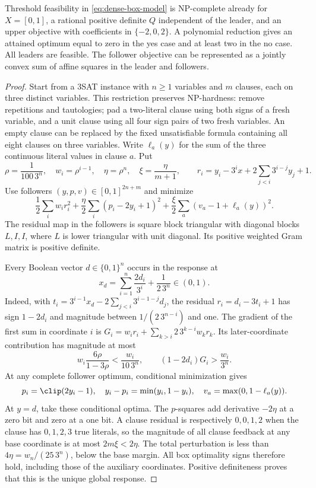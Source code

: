 \begin{theorem}\label{thm:dense-hardness}
Threshold feasibility in \eqref{eq:dense-box-model} is NP-complete already for
\(X=[0,1]\), a rational positive definite \(Q\) independent of the leader, and an upper objective
with coefficients in \(\{-2,0,2\}\). A polynomial reduction gives an attained
optimum equal to zero in the yes case and at least two in the no case. All
leaders are feasible. The follower objective can be represented as a jointly
convex sum of affine squares in the leader and followers.
\end{theorem}
\begin{proof}
Start from a 3SAT instance with \(n\ge1\) variables and \(m\) clauses, each on
three distinct variables. This restriction preserves NP-hardness: remove
repetitions and tautologies; pad a two-literal clause using both signs of a
fresh variable, and a unit clause using all four sign pairs of two fresh
variables. An empty clause can be replaced by the fixed unsatisfiable formula
containing all eight clauses on three variables. Write \(\ell_a(y)\) for the
sum of the three continuous literal values in clause \(a\).
Put
\[
 \rho=\frac1{100\,3^n},\quad w_i=\rho^{i-1},\quad
 \eta=\rho^n,\quad \xi=\frac\eta{m+1},\qquad
 r_i=y_i-3^ix+2\sum_{j<i}3^{i-j}y_j+1.
\]
Use followers \((y,p,v)\in[0,1]^{2n+m}\) and minimize
\begin{equation}\label{eq:dense-square-gadget}
 \frac12\sum_iw_ir_i^2+
 \frac\eta2\sum_i(p_i-2y_i+1)^2+
 \frac\xi2\sum_a(v_a-1+\ell_a(y))^2.
\end{equation}
The residual map in the followers is square block triangular with diagonal
blocks \(L,I,I\), where \(L\) is lower triangular with unit diagonal.
Its positive weighted Gram matrix is positive definite.

Every Boolean vector \(d\in\{0,1\}^n\) occurs in the response at
\[
 x_d=\sum_{i=1}^n\frac{2d_i}{3^i}+\frac1{2\,3^n}\in(0,1).
\]
Indeed, with \(t_i=3^{i-1}x_d-2\sum_{j<i}3^{i-1-j}d_j\), the residual
\(r_i=d_i-3t_i+1\) has sign \(1-2d_i\) and magnitude between
\(1/(2\,3^{n-i})\) and one. The gradient of the first sum in coordinate \(i\)
is \(G_i=w_ir_i+\sum_{k>i}2\,3^{k-i}w_kr_k\). Its later-coordinate contribution
has magnitude at most
\[
 w_i\frac{6\rho}{1-3\rho}<\frac{w_i}{10\,3^n},
 \qquad (1-2d_i)G_i>\frac{w_i}{3^n}.
\]
At any complete follower optimum, conditional minimization gives
\begin{equation}\label{eq:shortfall-readout}
 p_i=\clip(2y_i-1),\quad y_i-p_i=\min(y_i,1-y_i),\quad
 v_a=\max(0,1-\ell_a(y)).
\end{equation}
At \(y=d\), take these conditional optima. The \(p\)-squares add derivative
\(-2\eta\) at a zero bit and zero at a one bit. A clause residual is respectively
\(0,0,1,2\) when the clause has \(0,1,2,3\) true literals, so the magnitude of
all clause feedback at any base coordinate is at most \(2m\xi<2\eta\).
The total perturbation is less than
\(4\eta=w_n/(25\,3^n)\), below the base margin. All box optimality signs
therefore hold, including those of the auxiliary coordinates. Positive
definiteness proves that this is the unique global response.


\end{proof}
